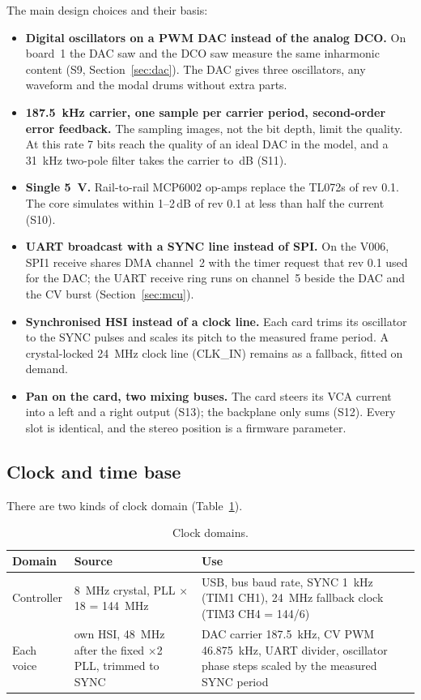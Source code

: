 \documentclass[11pt,a4paper]{article}
\begin{document}
The main design choices and their basis:
\begin{itemize}
  \item \textbf{Digital oscillators on a PWM DAC instead of the analog DCO.} On board~1 the DAC saw and the DCO saw
    measure the same inharmonic content (S9, Section~\ref{sec:dac}). The DAC gives three oscillators, any waveform and
    the modal drums without extra parts.
  \item \textbf{\SI{187.5}{kHz} carrier, one sample per carrier period, second-order error feedback.} The sampling
    images, not the bit depth, limit the quality. At this rate 7 bits reach the quality of an ideal DAC in the model,
    and a \SI{31}{kHz} two-pole filter takes the carrier to \statSelevenCarrier\,dB (S11).
  \item \textbf{Single \SI{5}{V}.} Rail-to-rail MCP6002 op-amps replace the TL072s of rev 0.1. The core simulates
    within 1--2\,dB of rev 0.1 at less than half the current (S10).
  \item \textbf{UART broadcast with a SYNC line instead of SPI.} On the V006, SPI1 receive shares DMA channel~2 with
    the timer request that rev 0.1 used for the DAC; the UART receive ring runs on channel~5 beside the DAC and the CV
    burst (Section~\ref{sec:mcu}).
  \item \textbf{Synchronised HSI instead of a clock line.} Each card trims its oscillator to the SYNC pulses and scales
    its pitch to the measured frame period. A crystal-locked \SI{24}{MHz} clock line (CLK\_IN) remains as a fallback,
    fitted on demand.
  \item \textbf{Pan on the card, two mixing buses.} The card steers its VCA current into a left and a right output
    (S13); the backplane only sums (S12). Every slot is identical, and the stereo position is a firmware parameter.
\end{itemize}

\subsection{Clock and time base}\label{sec:clock}
There are two kinds of clock domain (Table~\ref{tab:clocks}).

\begin{table}[htbp]
\centering\small
\caption{Clock domains.}\label{tab:clocks}
\begin{tabularx}{\textwidth}{@{}l >{\raggedright}p{4.6cm} >{\raggedright\arraybackslash}X@{}}
\toprule
Domain & Source & Use \\
\midrule
Controller & \SI{8}{MHz} crystal, PLL $\times$18 = \SI{144}{MHz} & USB, bus baud rate, SYNC \SI{1}{kHz} (TIM1 CH1),
  \SI{24}{MHz} fallback clock (TIM3 CH4 = 144/6) \\
Each voice & own HSI, \SI{48}{MHz} after the fixed $\times$2 PLL, trimmed to SYNC & DAC carrier \SI{187.5}{kHz}, CV PWM
  \SI{46.875}{kHz}, UART divider, oscillator phase steps scaled by the measured SYNC period \\
\bottomrule
\end{tabularx}
\end{table}
\end{document}
